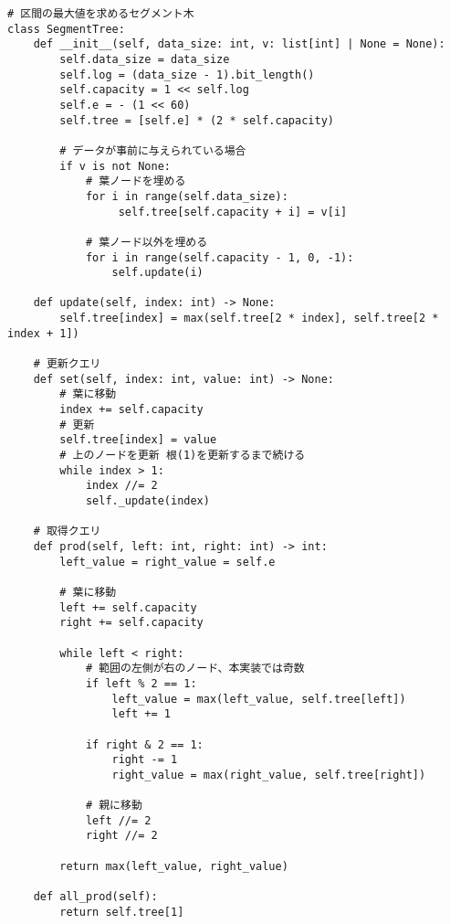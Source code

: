 \begin{lstlisting}[caption=セグメント木の実装, label=segment, frame=TRBL, label={segment}]
# 区間の最大値を求めるセグメント木
class SegmentTree:
    def __init__(self, data_size: int, v: list[int] | None = None):
        self.data_size = data_size
        self.log = (data_size - 1).bit_length()
        self.capacity = 1 << self.log
        self.e = - (1 << 60)
        self.tree = [self.e] * (2 * self.capacity)

        # データが事前に与えられている場合
        if v is not None:
            # 葉ノードを埋める
            for i in range(self.data_size):
                 self.tree[self.capacity + i] = v[i]
                 
            # 葉ノード以外を埋める 
            for i in range(self.capacity - 1, 0, -1):
                self.update(i)
    
    def update(self, index: int) -> None:
        self.tree[index] = max(self.tree[2 * index], self.tree[2 * index + 1])

    # 更新クエリ
    def set(self, index: int, value: int) -> None:
        # 葉に移動
        index += self.capacity
        # 更新
        self.tree[index] = value
        # 上のノードを更新 根(1)を更新するまで続ける
        while index > 1:
            index //= 2
            self._update(index)
            
    # 取得クエリ
    def prod(self, left: int, right: int) -> int:
        left_value = right_value = self.e
        
        # 葉に移動
        left += self.capacity
        right += self.capacity
        
        while left < right:
            # 範囲の左側が右のノード、本実装では奇数
            if left % 2 == 1:
                left_value = max(left_value, self.tree[left])
                left += 1
            
            if right & 2 == 1:
                right -= 1
                right_value = max(right_value, self.tree[right])
                
            # 親に移動
            left //= 2 
            right //= 2
        
        return max(left_value, right_value)

    def all_prod(self):
        return self.tree[1]
    

\end{lstlisting}

\newpage

